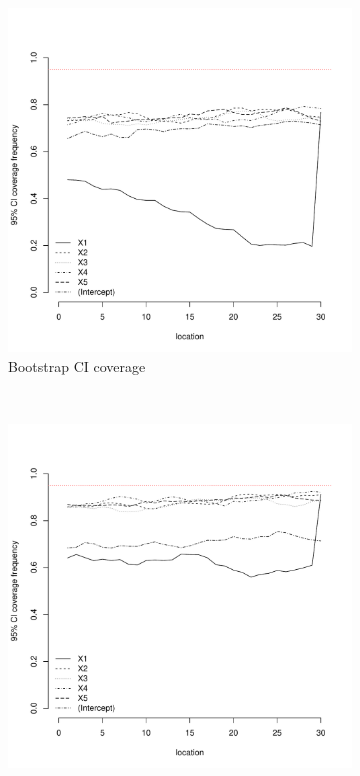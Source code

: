 \documentclass[authoryear, review, 11pt]{elsarticle}
\begin{document}
\begin{figure}
	\vspace{-30mm}
	\centering
	\begin{subfigure}[b]{0.45\textwidth}
	\centering
		\includegraphics[width=\textwidth]{../../figures/simulation/15.28.profile_bootstrap_coverage.pdf}
		\caption{Bootstrap CI coverage}
	\end{subfigure}%
	~ %
	\begin{subfigure}[b]{0.45\textwidth}
	\centering
		\includegraphics[width=\textwidth]{../../figures/simulation/15.28.profile_se_coverage.pdf}

\end{subfigure}
\end{figure}
\end{document}
